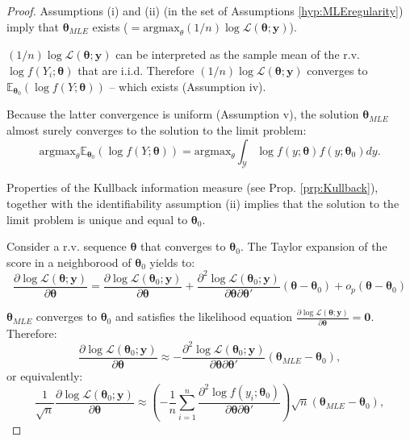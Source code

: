 \documentclass[
  12pt,
]{book}
\theoremstyle{definition}
\theoremstyle{definition}
\theoremstyle{definition}
\theoremstyle{definition}
\theoremstyle{remark}
\begin{document}
\begin{proof}
Assumptions (i) and (ii) (in the set of Assumptions \ref{hyp:MLEregularity}) imply that \(\boldsymbol\theta_{MLE}\) exists (\(=\mbox{argmax}_\theta (1/n)\log \mathcal{L}(\boldsymbol\theta;\mathbf{y})\)).

\((1/n)\log \mathcal{L}(\boldsymbol\theta;\mathbf{y})\) can be interpreted as the sample mean of the r.v. \(\log f(Y_i;\boldsymbol\theta)\) that are i.i.d. Therefore \((1/n)\log \mathcal{L}(\boldsymbol\theta;\mathbf{y})\) converges to \(\mathbb{E}_{\boldsymbol\theta_0}(\log f(Y;\boldsymbol\theta))\) -- which exists (Assumption iv).

Because the latter convergence is uniform (Assumption v), the solution \(\boldsymbol\theta_{MLE}\) almost surely converges to the solution to the limit problem:
\[
\mbox{argmax}_\theta \mathbb{E}_{\boldsymbol\theta_0}(\log f(Y;\boldsymbol\theta)) = \mbox{argmax}_\theta \int_{\mathcal{Y}} \log f(y;\boldsymbol\theta)f(y;\boldsymbol\theta_0) dy.
\]

Properties of the Kullback information measure (see Prop. \ref{prp:Kullback}), together with the identifiability assumption (ii) implies that the solution to the limit problem is unique and equal to \(\boldsymbol\theta_0\).

Consider a r.v. sequence \(\boldsymbol\theta\) that converges to \(\boldsymbol\theta_0\). The Taylor expansion of the score in a neighborood of \(\boldsymbol\theta_0\) yields to:
\[
\frac{\partial \log \mathcal{L}(\boldsymbol\theta;\mathbf{y})}{\partial \boldsymbol\theta} = \frac{\partial \log \mathcal{L}(\boldsymbol\theta_0;\mathbf{y})}{\partial \boldsymbol\theta} + \frac{\partial^2 \log \mathcal{L}(\boldsymbol\theta_0;\mathbf{y})}{\partial \boldsymbol\theta \partial \boldsymbol\theta'}(\boldsymbol\theta - \boldsymbol\theta_0) + o_p(\boldsymbol\theta - \boldsymbol\theta_0)
\]

\(\boldsymbol\theta_{MLE}\) converges to \(\boldsymbol\theta_0\) and satisfies the likelihood equation \(\frac{\partial \log \mathcal{L}(\boldsymbol\theta;\mathbf{y})}{\partial \boldsymbol\theta} = \mathbf{0}\). Therefore:
\[
\frac{\partial \log \mathcal{L}(\boldsymbol\theta_0;\mathbf{y})}{\partial \boldsymbol\theta} \approx - \frac{\partial^2 \log \mathcal{L}(\boldsymbol\theta_0;\mathbf{y})}{\partial \boldsymbol\theta \partial \boldsymbol\theta'}(\boldsymbol\theta_{MLE} - \boldsymbol\theta_0),
\]
or equivalently:
\[
\frac{1}{\sqrt{n}} \frac{\partial \log \mathcal{L}(\boldsymbol\theta_0;\mathbf{y})}{\partial \boldsymbol\theta} \approx
\left(- \frac{1}{n} \sum_{i=1}^n \frac{\partial^2 \log f(y_i;\boldsymbol\theta_0)}{\partial \boldsymbol\theta \partial \boldsymbol\theta'} \right)\sqrt{n}(\boldsymbol\theta_{MLE} - \boldsymbol\theta_0),
\]


\end{proof}
\end{document}
